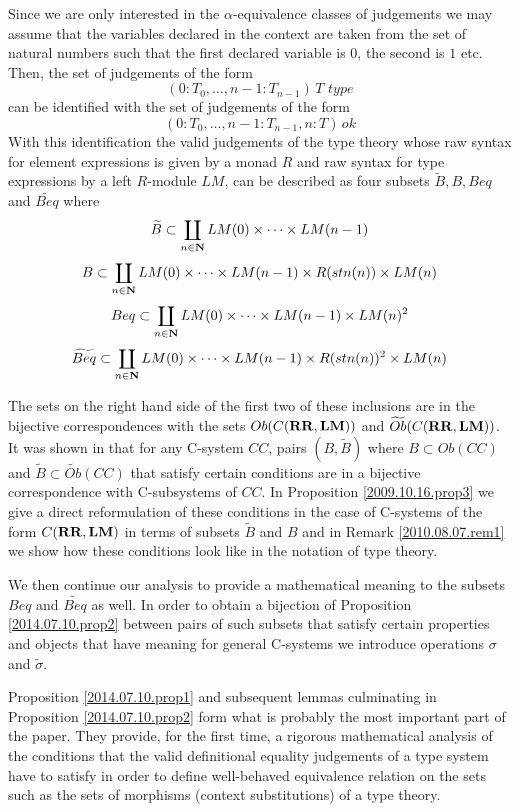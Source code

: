 \documentclass[11pt]{article}
\newcommand{\nn}{{\bf N\rm}}
\newcommand{\nat}{\nn}
\newcommand{\wt}{\widetilde}
\newcommand{\RR}{{\bf RR}}
\newcommand{\LM}{{\bf LM}}
\begin{document}
Since we are only interested in the $\alpha$-equivalence classes of judgements we may assume that the variables declared in the context are taken from the set of natural numbers such that the first declared variable is $0$, the second is $1$ etc.  Then, the set of judgements of the form 
%
$$(0:T_0,\dots,{n-1}:T_{n-1})\,T\,\,type$$
%
can be identified with the set of judgements of the form 
%
$$(0:T_0,\dots,{n-1}:T_{n-1}, n:T)\,ok$$
%
With this identification the valid judgements of the type theory whose raw syntax for element expressions is given by a monad $R$ and raw syntax for type expressions by a left $R$-module $LM$, can be described as four subsets ${\wt{B}},{B},{Beq}$ and ${\wt{Beq}}$ where 
%
$${\wt{B}} \subset \coprod_{n\in\nat} LM(0)\times\dots\times LM(n-1)$$
$${B}\subset  \coprod_{n\in\nat} LM(0)\times\dots\times LM(n-1)\times R({stn(n)})\times LM(n)$$
$${Beq} \subset \coprod_{n\in\nat} LM(0)\times\dots\times LM(n-1)\times LM(n)^2$$
$${\wt{Beq}} \subset \coprod_{n\in\nat} LM(0)\times\dots\times LM(n-1)\times R({stn(n)})^2\times LM(n)$$ 
%

The sets on the right hand side of the first two of these inclusions are in the bijective correspondences with the sets $Ob(C(\RR,\LM))$ and $\wt{Ob}(C(\RR,\LM))$. It was shown in \cite[Proposition 4.3]{Csubsystems} that for any C-system $CC$, pairs $(B,\wt{B})$ where $B\subset Ob(CC)$ and $\wt{B}\subset \wt{Ob}(CC)$ that satisfy certain conditions are in a bijective correspondence with C-subsystems of $CC$. In Proposition \ref{2009.10.16.prop3} we give a direct reformulation of these conditions in the case of C-systems of the form $C(\RR,\LM)$ in terms of subsets ${\wt{B}}$ and ${B}$ and in Remark \ref{2010.08.07.rem1} we show how these conditions look like in the notation of type theory. 

We then continue our analysis to provide a mathematical meaning to the subsets ${Beq}$ and ${\wt{Beq}}$ as well. In order to obtain a bijection of Proposition \ref{2014.07.10.prop2} between pairs of such subsets that satisfy certain properties and objects that have meaning for general C-systems we introduce operations $\sigma$ and $\wt{\sigma}$. 

Proposition \ref{2014.07.10.prop1} and subsequent lemmas culminating in Proposition \ref{2014.07.10.prop2} form what is probably the most important part of the paper. They provide, for the first time, a rigorous mathematical analysis of the conditions that the valid definitional equality judgements of a type system have to satisfy in order to define well-behaved equivalence relation on the sets such as the sets of morphisms (context substitutions) of a type theory. 
\end{document}
